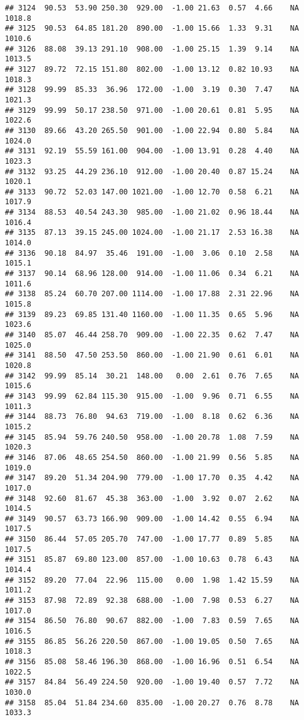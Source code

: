 \documentclass{article}\usepackage{graphicx, color}
\makeatletter
\newenvironment{kframe}{%
 \def\at@end@of@kframe{}%
 \ifinner\ifhmode%
  \def\at@end@of@kframe{\end{minipage}}%
  \begin{minipage}{\columnwidth}%
 \fi\fi%
 \def\FrameCommand##1{\hskip\@totalleftmargin \hskip-\fboxsep
 \colorbox{shadecolor}{##1}\hskip-\fboxsep
     \hskip-\linewidth \hskip-\@totalleftmargin \hskip\columnwidth}%
 \MakeFramed {\advance\hsize-\width
   \@totalleftmargin\z@ \linewidth\hsize
   \@setminipage}}%
 {\par\unskip\endMakeFramed%
 \at@end@of@kframe}
\newenvironment{knitrout}{}{} %
\makeatother
\begin{document}
\begin{knitrout}
\begin{kframe}
\begin{verbatim}
## 3124  90.53  53.90 250.30  929.00  -1.00 21.63  0.57  4.66    NA 1018.8
## 3125  90.53  64.85 181.20  890.00  -1.00 15.66  1.33  9.31    NA 1010.6
## 3126  88.08  39.13 291.10  908.00  -1.00 25.15  1.39  9.14    NA 1013.5
## 3127  89.72  72.15 151.80  802.00  -1.00 13.12  0.82 10.93    NA 1018.3
## 3128  99.99  85.33  36.96  172.00  -1.00  3.19  0.30  7.47    NA 1021.3
## 3129  99.99  50.17 238.50  971.00  -1.00 20.61  0.81  5.95    NA 1022.6
## 3130  89.66  43.20 265.50  901.00  -1.00 22.94  0.80  5.84    NA 1024.0
## 3131  92.19  55.59 161.00  904.00  -1.00 13.91  0.28  4.40    NA 1023.3
## 3132  93.25  44.29 236.10  912.00  -1.00 20.40  0.87 15.24    NA 1020.1
## 3133  90.72  52.03 147.00 1021.00  -1.00 12.70  0.58  6.21    NA 1017.9
## 3134  88.53  40.54 243.30  985.00  -1.00 21.02  0.96 18.44    NA 1016.4
## 3135  87.13  39.15 245.00 1024.00  -1.00 21.17  2.53 16.38    NA 1014.0
## 3136  90.18  84.97  35.46  191.00  -1.00  3.06  0.10  2.58    NA 1015.1
## 3137  90.14  68.96 128.00  914.00  -1.00 11.06  0.34  6.21    NA 1011.6
## 3138  85.24  60.70 207.00 1114.00  -1.00 17.88  2.31 22.96    NA 1015.8
## 3139  89.23  69.85 131.40 1160.00  -1.00 11.35  0.65  5.96    NA 1023.6
## 3140  85.07  46.44 258.70  909.00  -1.00 22.35  0.62  7.47    NA 1025.0
## 3141  88.50  47.50 253.50  860.00  -1.00 21.90  0.61  6.01    NA 1020.8
## 3142  99.99  85.14  30.21  148.00   0.00  2.61  0.76  7.65    NA 1015.6
## 3143  99.99  62.84 115.30  915.00  -1.00  9.96  0.71  6.55    NA 1011.3
## 3144  88.73  76.80  94.63  719.00  -1.00  8.18  0.62  6.36    NA 1015.2
## 3145  85.94  59.76 240.50  958.00  -1.00 20.78  1.08  7.59    NA 1020.3
## 3146  87.06  48.65 254.50  860.00  -1.00 21.99  0.56  5.85    NA 1019.0
## 3147  89.20  51.34 204.90  779.00  -1.00 17.70  0.35  4.42    NA 1017.0
## 3148  92.60  81.67  45.38  363.00  -1.00  3.92  0.07  2.62    NA 1014.5
## 3149  90.57  63.73 166.90  909.00  -1.00 14.42  0.55  6.94    NA 1017.5
## 3150  86.44  57.05 205.70  747.00  -1.00 17.77  0.89  5.85    NA 1017.5
## 3151  85.87  69.80 123.00  857.00  -1.00 10.63  0.78  6.43    NA 1014.4
## 3152  89.20  77.04  22.96  115.00   0.00  1.98  1.42 15.59    NA 1011.2
## 3153  87.98  72.89  92.38  688.00  -1.00  7.98  0.53  6.27    NA 1017.0
## 3154  86.50  76.80  90.67  882.00  -1.00  7.83  0.59  7.65    NA 1016.5
## 3155  86.85  56.26 220.50  867.00  -1.00 19.05  0.50  7.65    NA 1018.3
## 3156  85.08  58.46 196.30  868.00  -1.00 16.96  0.51  6.54    NA 1022.5
## 3157  84.84  56.49 224.50  920.00  -1.00 19.40  0.57  7.72    NA 1030.0
## 3158  85.04  51.84 234.60  835.00  -1.00 20.27  0.76  8.78    NA 1033.3

\end{verbatim}
\end{kframe}
\end{knitrout}
\end{document}

